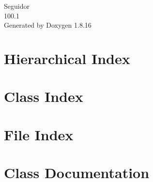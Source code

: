 \let\mypdfximage\pdfximage\def\pdfximage{\immediate\mypdfximage}\documentclass[twoside]{book}
\newcommand{\+}{\discretionary{\mbox{\scriptsize$\hookleftarrow$}}{}{}}
\newcommand{\clearemptydoublepage}{%
  \newpage{\pagestyle{empty}\cleardoublepage}%
}
\begin{document}
\hypersetup{pageanchor=false,
             bookmarksnumbered=true,
             pdfencoding=unicode
            }
\begin{titlepage}
\vspace*{7cm}
\begin{center}%
{\Large Seguidor \\[1ex]\large 100.\+1 }\\
\vspace*{1cm}
{\large Generated by Doxygen 1.8.16}\\
\end{center}
\end{titlepage}
\clearemptydoublepage
{}
\tableofcontents
\clearemptydoublepage
{}
\hypersetup{pageanchor=true}

\chapter{Hierarchical Index}

\chapter{Class Index}

\chapter{File Index}

\chapter{Class Documentation}


























\end{document}
